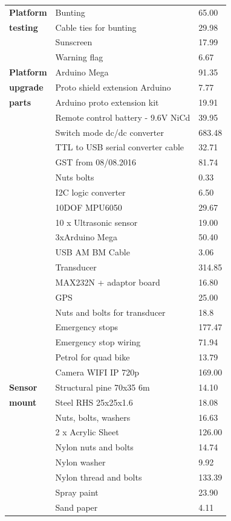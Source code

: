 \documentclass[main.tex]{subfiles}
\begin{document}
\begin{appendices}
{\begin{longtable}{L{0.20\textwidth} L{0.52\textwidth} L{0.18\textwidth}}
\textbf{Platform} & Bunting & 65.00 \\
\textbf{testing} & Cable ties for bunting & 29.98 \\
 &	Sunscreen & 17.99 \\
 &	Warning flag & 6.67 \\ \midrule
\textbf{Platform} & Arduino Mega &	91.35 \\
\textbf{upgrade} & Proto shield extension Arduino &	7.77 \\
\textbf{parts} & Arduino proto extension kit &	19.91 \\
 & Remote control battery - 9.6V NiCd &	39.95 \\
 & Switch mode dc/dc converter &	683.48 \\
 & TTL to USB serial converter cable &	32.71 \\
 & GST from 08/08.2016 &	81.74 \\
 & Nuts bolts &	0.33 \\
 & I2C logic converter &	6.50 \\
 & 10DOF MPU6050 &	29.67 \\
 & 10 x Ultrasonic sensor &	19.00 \\
 & 3xArduino Mega &	50.40 \\
 & USB AM BM Cable &	3.06 \\
 & Transducer &	314.85 \\
 & MAX232N + adaptor board &	16.80 \\
 & GPS &	25.00 \\
 & Nuts and bolts for transducer &	18.8 \\
 & Emergency stops  &	177.47 \\
 & Emergency stop wiring &	71.94 \\
 & Petrol for quad bike	 & 13.79 \\
 & Camera WIFI IP 720p &	169.00 \\ \midrule
\textbf{Sensor} &  Structural pine 70x35 6m	 & 14.10 \\
\textbf{mount} &  Steel RHS 25x25x1.6	 & 18.08 \\
 & Nuts, bolts, washers	 & 16.63 \\
 & 2 x Acrylic Sheet	 & 126.00 \\
 & Nylon nuts and bolts	 & 14.74 \\
 & Nylon washer	 & 9.92 \\
 & Nylon thread and bolts & 	133.39 \\
 & Spray paint & 	23.90 \\
 & Sand paper & 	4.11 \\

\end{longtable}}
\end{appendices}
\end{document}
